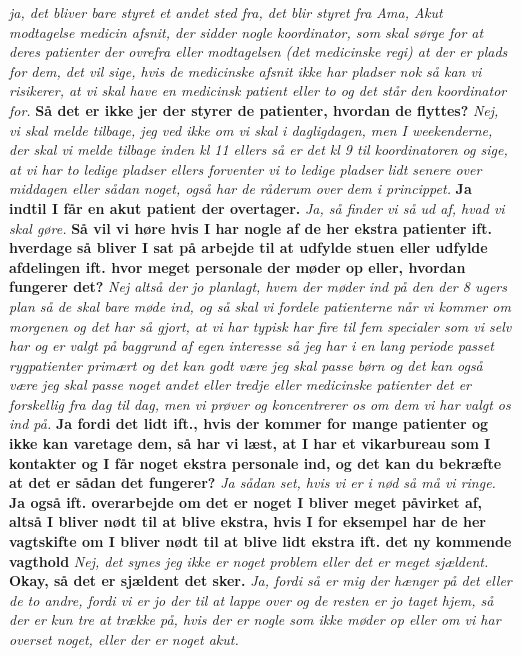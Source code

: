 \textit{ja, det bliver bare styret et andet sted fra, det blir styret fra Ama, Akut modtagelse medicin afsnit, der sidder nogle koordinator, som skal sørge for at deres patienter der ovrefra eller modtagelsen (det medicinske regi) at der er plads for dem, det vil sige, hvis de medicinske afsnit ikke har pladser nok så kan vi risikerer, at vi skal have en medicinsk patient eller to og det står den koordinator for.} 
\textbf{Så det er ikke jer der styrer de patienter, hvordan de flyttes?}
\textit{Nej, vi skal melde tilbage, jeg ved ikke om vi skal i dagligdagen, men I weekenderne, der skal vi melde tilbage inden kl 11 ellers så er det kl 9 til koordinatoren og sige, at vi har to ledige pladser ellers forventer vi to ledige pladser lidt senere over middagen eller sådan noget, også har de råderum over dem i princippet. }
\textbf{Ja indtil I får en akut patient der overtager.}
\textit{Ja, så finder vi så ud af, hvad vi skal gøre.}
\textbf{Så vil vi høre hvis I har nogle af de her ekstra patienter ift. hverdage så bliver I sat på arbejde til at udfylde stuen eller udfylde afdelingen ift. hvor meget personale der møder op eller, hvordan fungerer det?}
\textit{Nej altså der jo planlagt, hvem der møder ind på den der 8 ugers plan så de skal bare møde ind, og så skal vi fordele patienterne når vi kommer om morgenen og det har så gjort, at vi har typisk har fire til fem specialer som vi selv har og er valgt på baggrund af egen interesse så jeg har i en lang periode passet rygpatienter primært og det kan godt være jeg skal passe børn og det kan også være jeg skal passe noget andet eller tredje eller medicinske patienter det er forskellig fra dag til dag, men vi prøver og koncentrerer os om dem vi har valgt os ind på.}
\textbf{Ja fordi det lidt ift., hvis der kommer for mange patienter og ikke kan varetage dem, så har vi læst, at I har et vikarbureau som I kontakter og I får noget ekstra personale ind, og det kan du bekræfte at det er sådan det fungerer?} 
\textit{Ja sådan set, hvis vi er i nød så må vi ringe.}
\textbf{Ja også ift. overarbejde om det er noget I bliver meget påvirket af, altså I bliver nødt til at blive ekstra, hvis I for eksempel har de her vagtskifte om I bliver nødt til at blive lidt ekstra ift. det ny kommende vagthold}
\textit{Nej, det synes jeg ikke er noget problem eller det er meget sjældent.}
\textbf{Okay, så det er sjældent det sker.}
\textit{ Ja, fordi så er mig der hænger på det eller de to andre, fordi vi er jo der til at lappe over og de resten er jo taget hjem, så der er kun tre at trække på, hvis der er nogle som ikke møder op eller om vi har overset noget, eller der er noget akut. }
